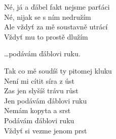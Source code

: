 Né, já a ďábel fakt nejsme parťáci\\
Né, nijak se s ním nedružím\\
Ale vždyť za mě soustavně utrácí\\
Vždyť mu to prostě dlužím

\cho{}
\ldots{}podávám ďáblovi ruku.

\cho{}
Tak co mě soudíš ty pitomej kluku\\
Není mi cítit síra z úst\\
Zas jen slyšíš trávu růst\\
Jen podávám ďáblovi ruku\\
Nemám kopyta a srst\\
Podávám ďáblovi ruku\\
Vždyť si vezme jenom prst

\esong{}